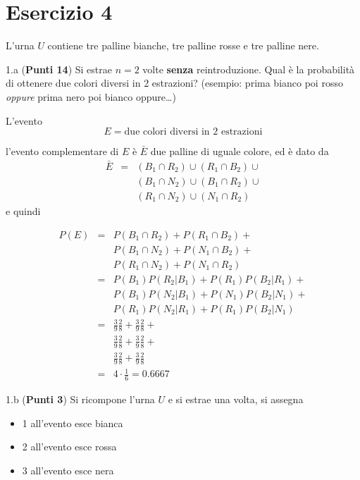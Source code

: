 \documentclass[
  11pt,
]{book}
\providecommand{\tightlist}{%
  \setlength{\itemsep}{0pt}\setlength{\parskip}{0pt}}
\theoremstyle{mytheoremstyle}
\theoremstyle{mydefstyle}
\newenvironment{sol}
  {
  \begin{tcolorbox}[enhanced,breakable,arc=0.1mm,boxrule=1pt,colback=white,colframe=iblue,
  title=\bf \fontfamily{lmss}\selectfont \hspace{.5 cm} Soluzione,drop fuzzy shadow]

}{
\end{tcolorbox}
  }
\begin{document}
\section{Esercizio 4}\label{esercizio-4}

L'urna \(U\) contiene tre palline bianche, tre palline rosse e tre palline nere.

1.a (\textbf{Punti 14}) Si estrae \(n=2\) volte \textbf{senza} reintroduzione. Qual è la probabilità di ottenere due colori diversi in 2 estrazioni? (esempio: prima bianco poi rosso \emph{oppure} prima nero poi bianco oppure\ldots)

\begin{sol}
L'evento
\[E=\text{due colori diversi in 2 estrazioni}\]

l'evento complementare di \(E\) è \(\bar E\) due palline di uguale colore, ed è dato da
\begin{eqnarray*}
\bar E&=& (B_1\cap R_2)\cup(R_1\cap B_2)\cup\\
& &(B_1\cap N_2)\cup (B_1\cap R_2)\cup\\
& &(R_1\cap N_2)\cup (N_1\cap R_2)
\end{eqnarray*}
e quindi

\begin{eqnarray*}
P(E)&=& P(B_1\cap R_2)+P(R_1\cap B_2)+\\
& &P(B_1\cap N_2)+ P(N_1\cap B_2)+\\
& &P(R_1\cap N_2)+ P(N_1\cap R_2)\\
&=&P(B_1)P(R_2|B_1)+P(R_1)P(B_2|R_1)+\\
&&P(B_1)P(N_2|B_1)+P(N_1)P(B_2|N_1)+\\
&&P(R_1)P(N_2|R_1)+P(R_1)P(B_2|N_1)\\
&=& \frac 39\frac 28+ \frac 39\frac 28+\\
&&  \frac 39\frac 28+ \frac 39\frac 28+\\
&&  \frac 39\frac 28+ \frac 39\frac 28\\
&=&4\cdot\frac 16=0.6667
\end{eqnarray*}

\end{sol}

1.b (\textbf{Punti 3}) Si ricompone l'urna \(U\) e si estrae una volta, si assegna

\begin{itemize}
\tightlist
\item
  1 all'evento esce bianca\\
\item
  2 all'evento esce rossa
\item
  3 all'evento esce nera
\end{itemize}
\end{document}
